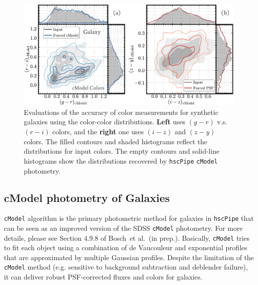 \documentclass[useamsfonts]{pasj01}
\def\etal{{\ et al.~}}
\def\hscpipe{\texttt{hscPipe}}
\def\cmodel{\texttt{cModel}}
\begin{document}
\begin{figure}
    \begin{center}
        \includegraphics[width=\textwidth]{fig/synpipe_galaxy_cdist}
    \end{center}
    \caption{
        Evaluations of the accuracy of color measurements for synthetic galaxies 
        using the color-color distributions. 
        \textbf{Left} uses $(g-r)$ v.s. $(r-i)$ colors, and the \textbf{right} one 
        uses $(i-z)$ and $(z-y)$ colors. 
        The filled contours and shaded histograms reflect the distributions for input 
        colors. 
        The empty contours and solid-line histograms show the distributions recovered 
        by \hscpipe{} \cmodel{} photometry.
        }
    \label{fig:galaxy_cdist}
\end{figure}

\subsection{cModel photometry of Galaxies}
    \label{ssec:cmodel}
    
    \cmodel{} algorithm is the primary photometric method for galaxies in 
    \hscpipe{} that can be seen as an improved version of the SDSS \cmodel{} 
    photometry. 
    For more details, please see Section 4.9.8 of Bosch\etal (in prep.). 
    Basically, \cmodel{} tries to fit each object using a combination of de Vaucouleur
    and exponential profiles that are approximated by multiple Gaussian profiles. 
    Despite the limitation of the \cmodel{} method (e.g. sensitive to background 
    subtraction and deblender failure), it can deliver robust PSF-corrected fluxes and 
    colors for galaxies. 
        
\end{document}
